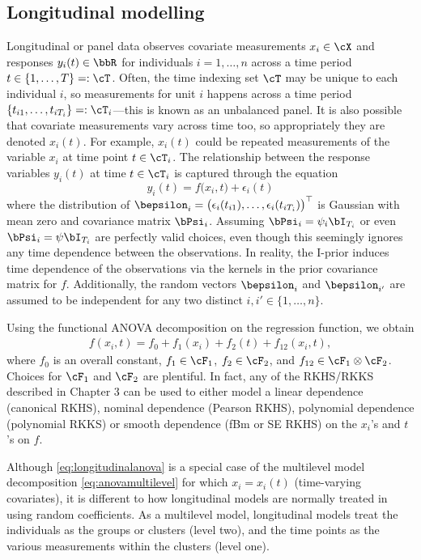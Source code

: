 \subsection{Longitudinal modelling}

Longitudinal or panel data observes covariate measurements $x_i\in\cX$ and responses $y_i(t)\in\bbR$ for individuals $i=1,\dots,n$ across a time period $t \in \{1,\dots,T\} =: \cT$. 
Often, the time indexing set $\cT$ may be unique to each individual $i$, so measurements for unit $i$ happens across a time period $\{t_{i1},\dots,t_{iT_i} \} =: \cT_i$---this is known as an unbalanced panel.
It is also possible that covariate measurements vary across time too, so appropriately they are denoted $x_i(t)$.
For example, $x_i(t)$ could be repeated measurements of the variable $x_i$ at time point $t\in\cT_i$.
The relationship between the response variables $y_i(t)$ at time $t\in\cT_i$ is captured through the equation
\[
  y_i(t) = f\big(x_i, t \big) + \epsilon_{i}(t)
\]
where the distribution of $\bepsilon_i = \big(\epsilon_i(t_{i1}),\dots,\epsilon_i(t_{iT_i}) \big)^\top$ is Gaussian with mean zero and covariance matrix $\bPsi_i$.
Assuming $\bPsi_i=\psi_i\bI_{T_i}$ or even $\bPsi_i=\psi\bI_{T_i}$ are perfectly valid choices, even though this seemingly ignores any time dependence between the observations.
In reality, the I-prior induces time dependence of the observations via the kernels in the prior covariance matrix for $f$.
Additionally, the random vectors $\bepsilon_i$ and $\bepsilon_{i'}$ are assumed to be independent for any two distinct $i,i'\in\{1,\dots,n\}$.

Using the functional ANOVA decomposition on the regression function, we obtain
\begin{align}\label{eq:longitudinalanova}
  f(x_i,t) = f_0 + f_1(x_i) + f_2(t) + f_{12}(x_i,t),
\end{align}
where $f_0$ is an overall constant, $f_1\in\cF_1$, $f_2\in\cF_2$, and $f_{12}\in\cF_1\otimes\cF_2$.
Choices for $\cF_1$ and $\cF_2$ are plentiful.
In fact, any of the RKHS/RKKS described in Chapter 3 can be used to either model a linear dependence (canonical RKHS), nominal dependence (Pearson RKHS), polynomial dependence (polynomial RKKS) or smooth dependence (fBm or SE RKHS) on the $x_i$'s and $t$'s on $f$.

\begin{remark}
  Although \eqref{eq:longitudinalanova} is a special case of the multilevel model decomposition \eqref{eq:anovamultilevel} for which $x_i = x_i(t)$ (time-varying covariates), it is different to how longitudinal models are normally treated in using random coefficients.
  As a multilevel model, longitudinal models treat the individuals as the groups or clusters (level two), and the time points as the various measurements within the clusters (level one).
\end{remark}

